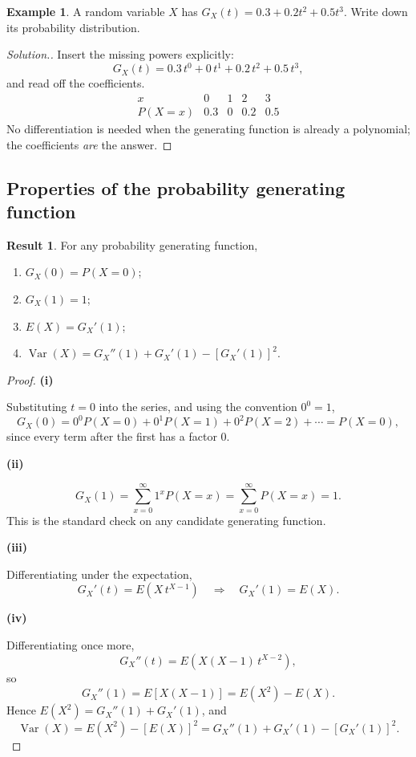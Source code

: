\documentclass[11pt,a4paper]{article}
\theoremstyle{definition}
\newtheorem{exa}[thm]{Example}
\newtheorem{result}[thm]{Result}
\newenvironment{solution}
  {\renewcommand{\qedsymbol}{}\begin{proof}[\textit{Solution}.]}
  {\end{proof}}
\newcommand{\subhead}[1]{%
  \par\medskip\noindent\textbf{#1}\par\nobreak\smallskip}
\DeclareMathOperator{\Var}{Var}
\begin{document}
\begin{exa}
A random variable $X$ has $G_X(t) = 0.3 + 0.2t^{2} + 0.5t^{3}$. Write down its
probability distribution.
\end{exa}

\begin{solution}
Insert the missing powers explicitly:
$$G_X(t) = 0.3\,t^{0} + 0\,t^{1} + 0.2\,t^{2} + 0.5\,t^{3},$$
and read off the coefficients.
$$\begin{array}{c|cccc}
x & 0 & 1 & 2 & 3\\ \hline
P(X=x) & 0.3 & 0 & 0.2 & 0.5
\end{array}$$
No differentiation is needed when the generating function is already a
polynomial; the coefficients \emph{are} the answer.
\end{solution}

\subsection{Properties of the probability generating function}

\begin{result}
For any probability generating function,
\begin{enumerate}
\item[(i)] $G_X(0) = P(X=0)$;
\item[(ii)] $G_X(1) = 1$;
\item[(iii)] $E(X) = G_X'(1)$;
\item[(iv)] $\Var(X) = G_X''(1) + G_X'(1) - \left[G_X'(1)\right]^{2}$.
\end{enumerate}
\end{result}

\begin{proof}
\subhead{(i)}
Substituting $t=0$ into the series, and using the convention $0^{0}=1$,
$$G_X(0) = 0^{0}P(X=0) + 0^{1}P(X=1) + 0^{2}P(X=2) + \cdots = P(X=0),$$
since every term after the first has a factor $0$.

\subhead{(ii)}
$$G_X(1) = \sum_{x=0}^{\infty}1^{x}P(X=x) = \sum_{x=0}^{\infty}P(X=x) = 1 .$$
This is the standard check on any candidate generating function.

\subhead{(iii)}
Differentiating under the expectation,
$$G_X'(t) = E\left(X\,t^{X-1}\right)
\quad\Longrightarrow\quad G_X'(1) = E(X).$$

\subhead{(iv)}
Differentiating once more,
$$G_X''(t) = E\left(X(X-1)\,t^{X-2}\right) ,$$
so
$$G_X''(1) = E\left[X(X-1)\right] = E\left(X^{2}\right) - E(X).$$
Hence $E\left(X^{2}\right) = G_X''(1) + G_X'(1)$, and
$$\Var(X) = E\left(X^{2}\right) - \left[E(X)\right]^{2}
= G_X''(1) + G_X'(1) - \left[G_X'(1)\right]^{2}.$$
\end{proof}
\end{document}
